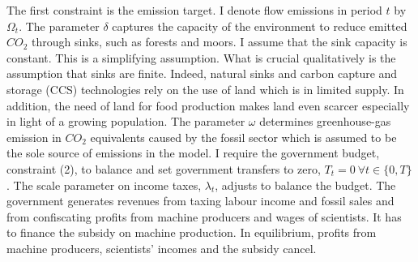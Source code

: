 The first constraint is the emission target. I denote flow emissions in period $t$ by $\Omega_t$.  The parameter $\delta$ captures the capacity of the environment to reduce emitted $CO_2$ through sinks, such as forests and moors.  I assume that the sink capacity is constant.  This is a simplifying assumption. What is crucial qualitatively is the assumption that sinks are finite. Indeed, natural sinks and carbon capture and storage (CCS) technologies rely on the use of land \citep{VanVuuren2018AlternativeTechnologies} which is in limited supply. In addition, the need of land for food production makes land even scarcer especially in light of a growing population. The parameter $\omega$ determines greenhouse-gas emission in $CO_2$ equivalents caused by the fossil sector which is assumed to be the sole source of emissions in the model. %
I require the government budget, constraint (2), to balance and set government transfers to zero, $T_t=0\ \forall t\in\{0,T\}$. The scale parameter on income taxes, $\lambda_t$, adjusts to balance the budget.
The government generates revenues from taxing labour income and fossil sales and from confiscating profits from machine producers and wages of scientists. It has to finance the subsidy on machine production. In equilibrium, profits from machine producers, scientists' incomes and the subsidy cancel. 


